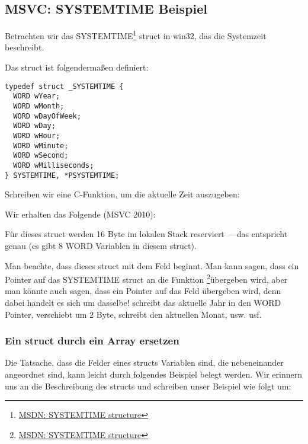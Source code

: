 \subsection{MSVC: SYSTEMTIME Beispiel}
\label{sec:SYSTEMTIME}

\newcommand{\FNSYSTEMTIME}{\footnote{\href{http://msdn.microsoft.com/en-us/library/ms724950(VS.85).aspx}{MSDN: SYSTEMTIME structure}}}
Betrachten wir das SYSTEMTIME\FNSYSTEMTIME{} struct in win32, das die Systemzeit beschreibt.

Das struct ist folgendermaßen definiert:

\begin{lstlisting}[caption=WinBase.h,style=customc]
typedef struct _SYSTEMTIME {
  WORD wYear;
  WORD wMonth;
  WORD wDayOfWeek;
  WORD wDay;
  WORD wHour;
  WORD wMinute;
  WORD wSecond;
  WORD wMilliseconds;
} SYSTEMTIME, *PSYSTEMTIME;
\end{lstlisting}
Schreiben wir eine C-Funktion, um die aktuelle Zeit auszugeben:



Wir erhalten das Folgende (MSVC 2010):


Für dieses struct werden 16 Byte im lokalen Stack reserviert~---das entspricht genau  (es gibt 8
WORD Variablen in diesem struct).

\newcommand{\FNMSDNGST}{\footnote{\href{http://msdn.microsoft.com/en-us/library/ms724390(VS.85).aspx}{MSDN: GetSystemTime function}}}
Man beachte, dass dieses struct mit dem  Feld beginnt.
Man kann sagen, dass ein Pointer auf das SYSTEMTIME struct an die Funktion \FNSYSTEMTIME übergeben
wird, aber man könnte auch sagen, dass ein Pointer auf das Feld  übergeben wird, denn dabei handelt es sich um
dasselbe!
 schreibt das aktuelle Jahr in den WORD Pointer, verschiebt um 2 Byte, schreibt den aktuellen Monat,
usw. usf. 



\subsubsection{Ein struct durch ein Array ersetzen}
Die Tatsache, dass die Felder eines structs Variablen sind, die nebeneinander angeordnet sind, kann leicht durch
folgendes Beispiel belegt werden. Wir erinnern uns an die Beschreibung des  structs und schreiben unser
Beispiel wie folgt um: 

